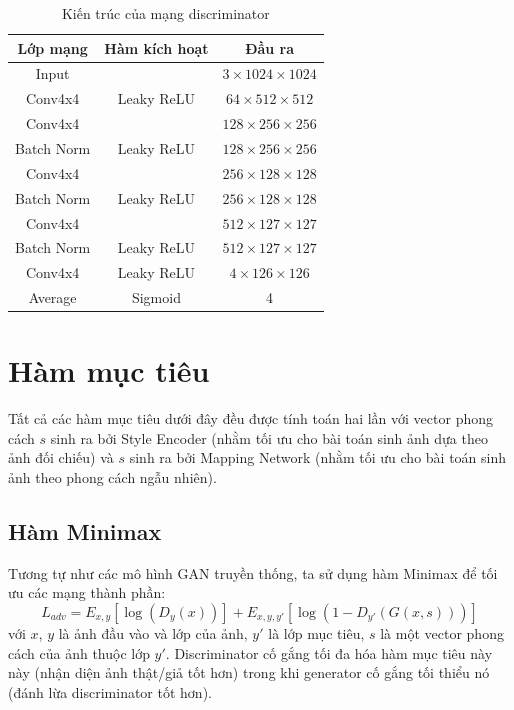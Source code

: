 \documentclass[12pt]{extreport}
\begin{document}
\begin{table}[H]
    \centering
    \begin{tabular}{c c c}
        Lớp mạng   & Hàm kích hoạt & Đầu ra                        \\
        \hline
        Input      &               & $ 3 \times 1024 \times 1024 $ \\
        \hline
        Conv4x4    & Leaky ReLU    & $ 64 \times 512 \times 512 $  \\
        Conv4x4    &               & $ 128 \times 256 \times 256 $ \\
        Batch Norm & Leaky ReLU    & $ 128 \times 256 \times 256 $ \\
        Conv4x4    &               & $ 256 \times 128 \times 128 $ \\
        Batch Norm & Leaky ReLU    & $ 256 \times 128 \times 128 $ \\
        Conv4x4    &               & $ 512 \times 127 \times 127 $ \\
        Batch Norm & Leaky ReLU    & $ 512 \times 127 \times 127 $ \\
        Conv4x4    & Leaky ReLU    & $ 4 \times 126 \times 126 $   \\
        Average    & Sigmoid       & 4
    \end{tabular}
    \caption{Kiến trúc của mạng discriminator}
\end{table}

\section{Hàm mục tiêu}

Tất cả các hàm mục tiêu dưới đây đều được tính toán hai lần với vector phong cách $ s $ sinh ra bởi Style Encoder (nhằm tối ưu cho bài toán sinh ảnh dựa theo ảnh đối chiếu) và $ s $ sinh ra bởi Mapping Network (nhằm tối ưu cho bài toán sinh ảnh theo phong cách ngẫu nhiên).

\subsection{Hàm Minimax}

Tương tự như các mô hình GAN truyền thống, ta sử dụng hàm Minimax để tối ưu các mạng thành phần:
$$ L_{adv} =  E_{x,y} [\log(D_y(x))] + E_{x,y,y'} [\log(1 - D_{y'}(G(x,s)))] $$
với $ x $, $ y $ là ảnh đầu vào và lớp của ảnh, $ y' $ là lớp mục tiêu, $ s $ là một vector phong cách của ảnh thuộc lớp $ y' $. Discriminator cố gắng tối đa hóa hàm mục tiêu này này (nhận diện ảnh thật/giả tốt hơn) trong khi generator cố gắng tối thiểu nó (đánh lừa discriminator tốt hơn).
\end{document}
